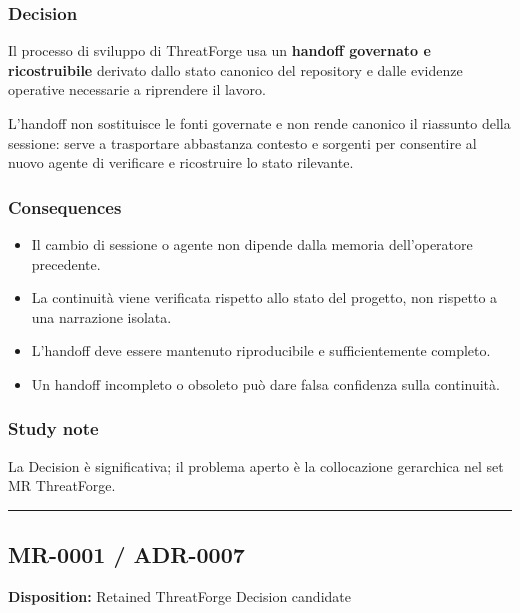 \documentclass[
  10pt,
  a4paper,
]{article}
\providecommand{\tightlist}{%
  \setlength{\itemsep}{0pt}\setlength{\parskip}{0pt}}
\begin{document}
\subsubsection{Decision}\label{decision-4}

Il processo di sviluppo di ThreatForge usa un \textbf{handoff governato
e ricostruibile} derivato dallo stato canonico del repository e dalle
evidenze operative necessarie a riprendere il lavoro.

L'handoff non sostituisce le fonti governate e non rende canonico il
riassunto della sessione: serve a trasportare abbastanza contesto e
sorgenti per consentire al nuovo agente di verificare e ricostruire lo
stato rilevante.

\subsubsection{Consequences}\label{consequences-4}

\begin{itemize}
\tightlist
\item
  Il cambio di sessione o agente non dipende dalla memoria
  dell'operatore precedente.
\item
  La continuità viene verificata rispetto allo stato del progetto, non
  rispetto a una narrazione isolata.
\item
  L'handoff deve essere mantenuto riproducibile e sufficientemente
  completo.
\item
  Un handoff incompleto o obsoleto può dare falsa confidenza sulla
  continuità.
\end{itemize}

\subsubsection{Study note}\label{study-note-3}

La Decision è significativa; il problema aperto è la collocazione
gerarchica nel set MR ThreatForge.

\begin{center}\rule{0.5\linewidth}{0.5pt}\end{center}

\subsection{MR-0001 / ADR-0007}\label{mr-0001-adr-0007}

\textbf{Disposition:} Retained ThreatForge Decision candidate
\end{document}
